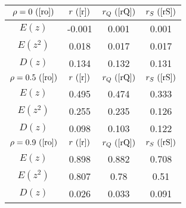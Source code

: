 \begin{tabular}{|c|c|c|c|}
\hline
$\rho = 0~(
\ref{ro})$ & $r ~(
\ref{r})$ & $r_Q ~(
\ref{rQ})$ & $r_S ~(
\ref{rS})$\\
\hline
$E(z)$ & -0.001 & 0.001 & 0.001\\
\hline
$E(z^2)$ & 0.018 & 0.017 & 0.017\\
\hline
$D(z)$ & 0.134 & 0.132 & 0.131\\
\hline
$\rho = 0.5~(
\ref{ro})$ & $r ~(
\ref{r})$ & $r_Q ~(
\ref{rQ})$ & $r_S ~(
\ref{rS})$\\
\hline
$E(z)$ & 0.495 & 0.474 & 0.333\\
\hline
$E(z^2)$ & 0.255 & 0.235 & 0.126\\
\hline
$D(z)$ & 0.098 & 0.103 & 0.122\\
\hline
$\rho = 0.9~(
\ref{ro})$ & $r ~(
\ref{r})$ & $r_Q ~(
\ref{rQ})$ & $r_S ~(
\ref{rS})$\\
\hline
$E(z)$ & 0.898 & 0.882 & 0.708\\
\hline
$E(z^2)$ & 0.807 & 0.78 & 0.51\\
\hline
$D(z)$ & 0.026 & 0.033 & 0.091\\
\hline
\end{tabular}